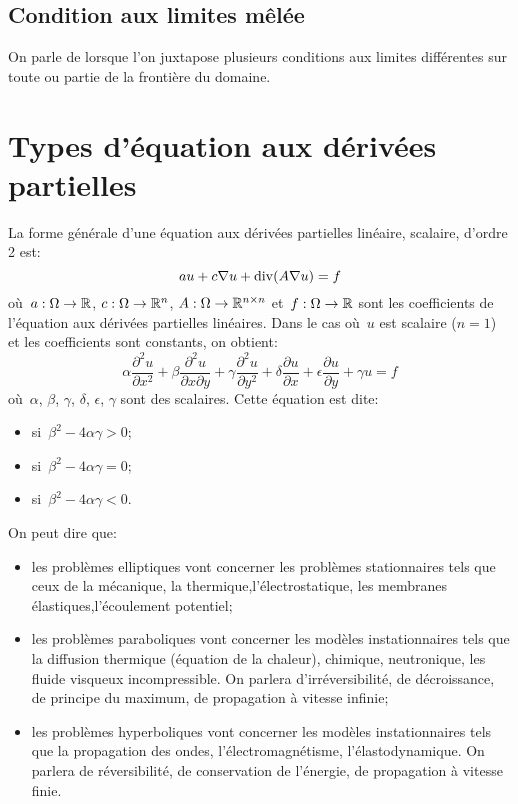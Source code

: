 \medskip
\subsection{Condition aux limites mêlée}
On parle de  lorsque l'on juxtapose plusieurs conditions aux limites différentes sur toute ou partie de la frontière du domaine.

\medskip
\section{Types d'équation aux dérivées partielles}
La forme générale d'une équation aux dérivées partielles linéaire, scalaire, d'ordre 2 est:
\begin{equation}
au + c \nabla u + \operatorname{div} (A\nabla u) = f
\end{equation}
où~$a: \Omega\rightarrow\mathbb R$, $c: \Omega\rightarrow\mathbb R^n$, 
$A: \Omega\rightarrow\mathbb R^{n\times n}$ et~$f: \Omega\rightarrow\mathbb R$ sont les coefficients de l'équation aux dérivées partielles linéaires.
\medskipvm
Dans le cas où~$u$ est scalaire ($n = 1$) et les coefficients sont constants, on obtient:
\begin{equation}
\alpha\dfrac{\partial^2 u}{\partial x^2}+\beta\dfrac{\partial^2 u}{\partial x\partial y}
+\gamma \dfrac{\partial^2 u}{\partial y^2} + \delta \dfrac{\partial u}{\partial x}
+ \epsilon \dfrac{\partial u}{\partial y} +\gamma u = f
\end{equation}
où~$\alpha$, $\beta$, $\gamma$, $\delta$, $\epsilon$, $\gamma$ sont des scalaires.
Cette équation est dite:
\begin{itemize}
  \item {} si~$\beta^2-4\alpha\gamma>0$;
  \item {} si~$\beta^2-4\alpha\gamma=0$;
  \item {} si~$\beta^2-4\alpha\gamma<0$.
\end{itemize}

\medskip
{}
On peut dire que:
\begin{itemize}
  \item les problèmes elliptiques vont concerner les problèmes stationnaires tels que ceux de la mécanique, la thermique,l'électrostatique, les membranes élastiques,l'écoulement potentiel;
  \item les problèmes paraboliques vont concerner les modèles instationnaires tels que la diffusion thermique (équation de la chaleur), chimique, neutronique, les fluide visqueux incompressible. On parlera d'irréversibilité, de décroissance, de principe du maximum, de propagation à vitesse infinie; 
  \item les problèmes hyperboliques vont concerner les modèles  instationnaires tels que la propagation des ondes, l'électromagnétisme, l'élastodynamique. On parlera de réversibilité, de conservation de l'énergie, de propagation à vitesse finie.
\end{itemize}

